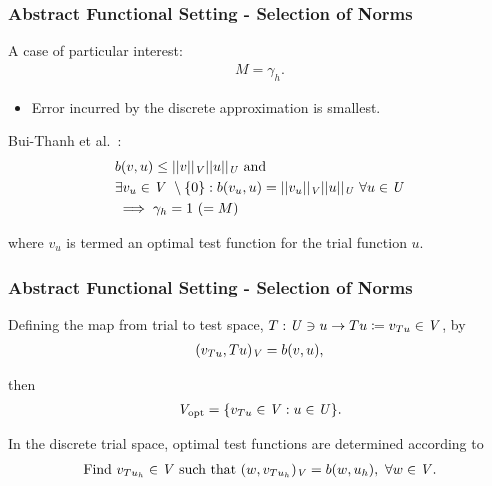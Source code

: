 \begin{frame}
\frametitle{Abstract Functional Setting - Selection of Norms}

A case of particular interest:
\begin{align} \label{eq:equal_m_gamma}
M = \gamma_h.
\end{align}

\begin{itemize}
  \item Error incurred by the discrete approximation is smallest.
\end{itemize}
\vspace{5mm}

Bui-Thanh et al.~\cite[Theorem ]{BuiThanh2013}:
\begin{align} \label{eq:bui_thanh_2-6}
 &  b(v,u) \le ||v||_{\mathit{{{V}}}} ||u||_{\mathit{{{U}}}}\ \text{and}\ \\
 & \exists v_u \in \mathit{{{V}}}\ \setminus \{0\} :
b(v_u,u) = ||v_u||_{\mathit{{{V}}}} ||u||_{\mathit{{{U}}}}\ \forall u \in \mathit{{{U}}} \\
& \implies \gamma_h = 1\ (= M)
\end{align}

where $v_u$ is termed an optimal test function for the trial function $u$.

\end{frame}

\begin{frame}
\frametitle{Abstract Functional Setting - Selection of Norms}

Defining the map from trial to test space,
$T: \mathit{{{U}}} \ni u \rightarrow Tu \coloneqq v_{Tu} \in \mathit{{{V}}} $, by
\begin{align}
(v_{Tu},Tu)_{\mathit{{{V}}}} = b(v,u),
\end{align}

then
\begin{align} \label{eq:def_discrete_test_space_alt}
\mathit{{{V}}}_\text{opt} = \{ v_{T u} \in \mathit{{{V}}} : u \in \mathit{{{U}}} \}.
\end{align}

In the discrete trial space, optimal test functions are determined according to
\begin{align} \label{eq:auxiliary_opt_v}
\text{Find}\ v_{T u_h} \in \mathit{{{V}}}\ \text{such that}\
(w,v_{T u_h})_{\mathit{{{V}}}} = b(w,u_h),\ \forall w \in \mathit{{{V}}}.
\end{align}

\end{frame}
